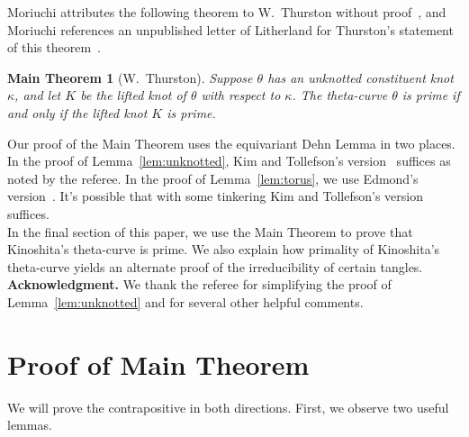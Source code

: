 \documentclass{amsart}
\numberwithin{equation}{section}
\newtheorem*{maintheorem}{Main Theorem}
\theoremstyle{definition}
\begin{document}
Moriuchi attributes the following theorem to W.~Thurston without proof~\cite[Prop.~4.1]{Mor04},
and Moriuchi references an unpublished letter of Litherland for Thurston's statement of this theorem~\cite[Prop.~5.1]{Mor09}.

\begin{maintheorem}[W.~Thurston]
Suppose $\theta$ has an unknotted constituent knot $\kappa$, and let $K$ be the lifted knot of $\theta$ with respect to $\kappa$.
The theta-curve $\theta$ is prime if and only if the lifted knot $K$ is prime.
\end{maintheorem}

Our proof of the Main Theorem uses the equivariant Dehn Lemma in two places.
In the proof of Lemma~\ref{lem:unknotted}, Kim and Tollefson's version~\cite[Lemma~3]{KT80} suffices as noted by the referee.
In the proof of Lemma~\ref{lem:torus}, we use Edmond's version~\cite{Edm86}.
It's possible that with some tinkering Kim and Tollefson's version suffices.\\

In the final section of this paper, we use the Main Theorem to prove that Kinoshita's theta-curve is prime.
We also explain how primality of Kinoshita's theta-curve yields an alternate proof of the irreducibility of certain tangles.\\

\noindent\textbf{Acknowledgment.} We thank the referee for simplifying the proof of Lemma~\ref{lem:unknotted} and for several other helpful comments.

\section{Proof of Main Theorem}
\label{sec:proof}

We will prove the contrapositive in both directions.
First, we observe two useful lemmas.
\end{document}
